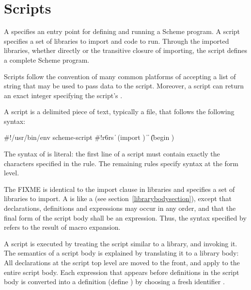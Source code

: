 \chapter{Scripts}
\label{scriptchapter}

A  specifies an entry point for defining and running
a Scheme program.  A script specifies a set of libraries to import and
code to run.  Through the imported libraries, whether directly or the
transitive closure of importing, the script defines a complete Scheme
program.

Scripts follow the convention of many common platforms of accepting a
list of string  that may be used to
pass data to the script.  Moreover, a script can return an exact
integer specifying the script's .

A script is a delimited piece of text, typically a file, that follows
the following syntax:

\begin{grammar}
 \: \#!/usr/bin/env scheme-script
  \> 
  \> 
 \: \#!r6rs  
  \> \|  
 \: (import )
 \:  
 \: 
\> \| 
\> \| 
\> \| (begin )
\end{grammar}

The syntax of  is literal: the first line of a
script must contain exactly the characters specified in the rule.  The
remaining rules specify syntax at the form level.  

The  FIXME is identical to the import clause in
libraries and specifies a set of libraries to import.  A  is like a  (see
section~\ref{librarybodysection}), except that declarations,
definitions and expressions may occur in any order, and that the final
form of the script body shall be an expression.  Thus, the syntax
specified by  refers to the result of macro
expansion.

A script is executed by treating the script similar to a library, and
invoking it.  The semantics of a script body is explained by
translating it to a library body: All declarations at the script top
level are moved to the front, and apply to the entire script body.
Each expression  that appears before definitions in
the script body is converted into a definition {\cf (define 
  )} by choosing a fresh identifier .

